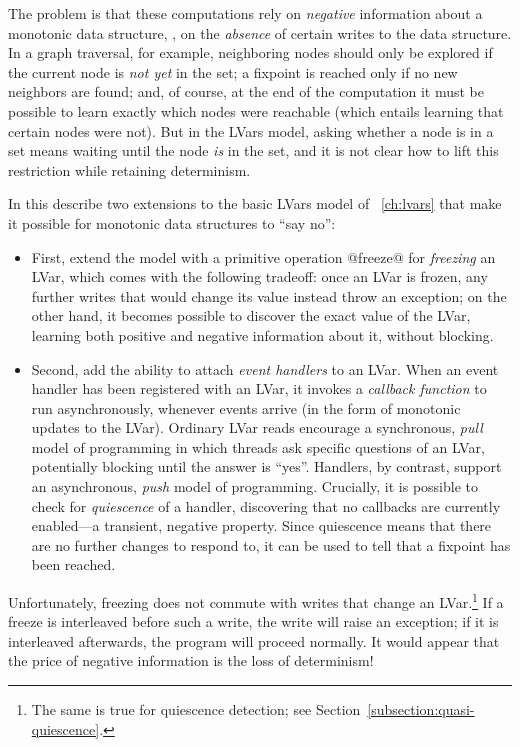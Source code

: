 The problem is that these computations rely on \emph{negative}
information about a monotonic data structure, \ie, on the
\emph{absence} of certain writes to the data structure.  In a graph
traversal, for example, neighboring nodes should only be explored if
the current node is \emph{not yet} in the set; a fixpoint is reached
only if no new neighbors are found; and, of course, at the end of the
computation it must be possible to learn exactly which nodes were
reachable (which entails learning that certain nodes were not).  But
in the LVars model, asking whether a node is in a set means waiting
until the node \emph{is} in the set, and it is not clear how to lift
this restriction while retaining determinism.

In this  describe two extensions to the basic LVars model of
~\ref{ch:lvars} that make it possible for monotonic data
structures to ``say no'':

\begin{itemize}
\item First,  extend the model with a primitive operation @freeze@
  for \emph{freezing} an LVar, which comes with the following
  tradeoff: once an LVar is frozen, any further writes that would
  change its value instead throw an exception; on the other hand, it
  becomes possible to discover the exact value of the LVar, learning
  both positive and negative information about it, without blocking.
\item
  Second,  add the ability to attach \emph{event handlers} to an
  LVar.  When an event handler has been registered with an LVar, it
  invokes a \emph{callback function} to run asynchronously, whenever
  events arrive (in the form of monotonic updates to the LVar).
  Ordinary LVar reads encourage a synchronous, \emph{pull} model of
  programming in which threads ask specific questions of an LVar,
  potentially blocking until the answer is ``yes''.  Handlers, by
  contrast, support an asynchronous, \emph{push} model of programming.
  Crucially, it is possible to check for \emph{quiescence} of a
  handler, discovering that no callbacks are currently enabled---a
  transient, negative property.  Since quiescence means that there are
  no further changes to respond to, it can be used to tell that a
  fixpoint has been reached.
\end{itemize}

Unfortunately, freezing does not commute with writes that change an
LVar.\footnote{The same is true for quiescence detection; see
Section~\ref{subsection:quasi-quiescence}.}  If a freeze is
interleaved before such a write, the write will raise an exception; if
it is interleaved afterwards, the program will proceed normally.  It
would appear that the price of negative information is the loss of
determinism!

